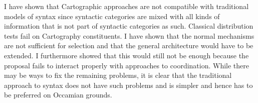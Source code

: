 I have shown that Cartographic approaches are not compatible with traditional models of syntax since
syntactic categories are mixed with all kinds of information that is not part of syntactic
categories as such. Classical distribution tests fail on Cartography constituents. I have shown that
the normal mechanisms are not sufficient for selection and that the general architecture would have
to be extended. I furthermore showed that this would still not be enough because the proposal fails
to interact properly with approaches to coordination. While there may be ways to fix the remaining
problems, it is clear that the traditional approach to syntax does not have such problems and is
simpler and hence has to be preferred on Occamian grounds.



